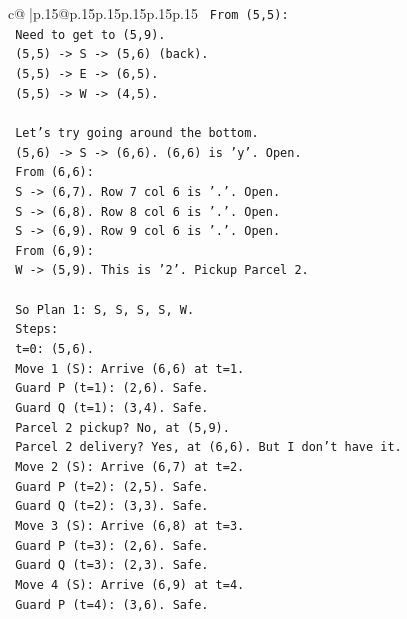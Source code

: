 \documentclass{article}
\begin{document}
{\begin{supertabular}{c@{$\;$}|p{.15\linewidth}@{}p{.15\linewidth}p{.15\linewidth}p{.15\linewidth}p{.15\linewidth}p{.15\linewidth}}
{{{\texttt{      From (5,5):} \\
\texttt{      Need to get to (5,9).} \\
\texttt{      (5,5) {-}> S {-}> (5,6) (back).} \\
\texttt{      (5,5) {-}> E {-}> (6,5).} \\
\texttt{      (5,5) {-}> W {-}> (4,5).} \\
\\ 
\texttt{      Let's try going around the bottom.} \\
\texttt{      (5,6) {-}> S {-}> (6,6). (6,6) is 'y'. Open.} \\
\texttt{      From (6,6):} \\
\texttt{      S {-}> (6,7). Row 7 col 6 is '.'. Open.} \\
\texttt{      S {-}> (6,8). Row 8 col 6 is '.'. Open.} \\
\texttt{      S {-}> (6,9). Row 9 col 6 is '.'. Open.} \\
\texttt{      From (6,9):} \\
\texttt{      W {-}> (5,9). This is '2'. Pickup Parcel 2.} \\
\\ 
\texttt{      So Plan 1: S, S, S, S, W.} \\
\texttt{      Steps:} \\
\texttt{      t=0: (5,6).} \\
\texttt{      Move 1 (S): Arrive (6,6) at t=1.} \\
\texttt{         Guard P (t=1): (2,6). Safe.} \\
\texttt{         Guard Q (t=1): (3,4). Safe.} \\
\texttt{         Parcel 2 pickup? No, at (5,9).} \\
\texttt{         Parcel 2 delivery? Yes, at (6,6). But I don't have it.} \\
\texttt{      Move 2 (S): Arrive (6,7) at t=2.} \\
\texttt{         Guard P (t=2): (2,5). Safe.} \\
\texttt{         Guard Q (t=2): (3,3). Safe.} \\
\texttt{      Move 3 (S): Arrive (6,8) at t=3.} \\
\texttt{         Guard P (t=3): (2,6). Safe.} \\
\texttt{         Guard Q (t=3): (2,3). Safe.} \\
\texttt{      Move 4 (S): Arrive (6,9) at t=4.} \\
\texttt{         Guard P (t=4): (3,6). Safe.} \\
}}}
\end{supertabular}}
\end{document}

